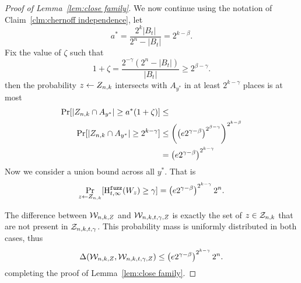 \begin{proof}[Proof of Lemma~\ref{lem:close family}]
\noindent
We now continue using the notation of Claim~\ref{clm:chernoff independence}, let 
\[
a^* =\frac{2^k|B_t|}{2^n - |B_t|}=2^{k-\beta}.
\]
Fix the value of $\zeta$ such that 
\[1+\zeta = \frac{2^{-\gamma}(2^n - |B_t|)}{|B_t|} \ge 2^{\beta-\gamma}. \]
then the probability $z\leftarrow Z_{n,k}$ intersects with $A_{y^*}$ in at least $2^{k-\gamma}$ places is at most 
\begin{align*}
\Pr[|Z_{n,k} \cap A_{y^*}| \ge a^*(1+\zeta)] &\le \\
\Pr[| Z_{n,k} \cap A_{y^*} | \ge 2^{k-\gamma}] &\le \left(\left(e2^{\gamma-\beta}\right)^{2^{\beta-\gamma}}\right)^{2^{k-\beta}} \\&= \left(e2^{\gamma-\beta}\right)^{2^{k-\gamma}}
\end{align*}
Now we consider a union bound across all $y^*$.  That is
\[
\Pr_{z\leftarrow Z_{n,k} }[\mathrm{H}^{\mathtt{fuzz}}_{t,\infty}(W_z)\ge \gamma] = \left(e2^{\gamma-\beta}\right)^{2^{k-\gamma}}2^n.
\]

The difference between $\mathcal{W}_{n,k, Z}$ and $\mathcal{W}_{n,k,t,\gamma, Z}$ is exactly the set of $z\in\mathcal{Z}_{n,k}$ that are not present in $\mathcal{Z}_{n,k,t,\gamma}$.  This probability mass is uniformly distributed in both cases, thus 
\[
\Delta(\mathcal{W}_{n,k, Z}, \mathcal{W}_{n,k,t,\gamma, Z}) \le \left(e2^{\gamma-\beta}\right)^{2^{k-\gamma}}2^n.
\]
completing the proof of Lemma~\ref{lem:close family}.
\end{proof}

